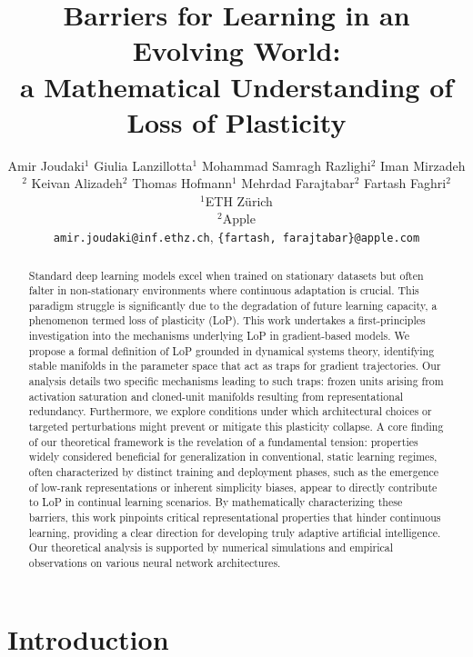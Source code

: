 \documentclass{article}
\title{Barriers for Learning in an Evolving World: \\a Mathematical Understanding of Loss of Plasticity}
\author{%
  Amir Joudaki$^{1}$ \And
  Giulia Lanzillotta$^{1}$ \And
  Mohammad Samragh Razlighi$^{2}$ \And
  Iman Mirzadeh$^{2}$ \And
  Keivan Alizadeh$^{2}$ \And
  Thomas Hofmann$^{1}$ \And
  Mehrdad Farajtabar$^{2}$ \And
  Fartash Faghri$^{2}$ \\
  $^{1}$ETH Zürich \\
  $^{2}$Apple \\
  \texttt{amir.joudaki@inf.ethz.ch},
  \texttt{\{fartash, farajtabar\}@apple.com}
}
\begin{document}
\maketitle

\begin{abstract}
    Standard deep learning models excel when trained on stationary datasets but often falter in non-stationary environments where continuous adaptation is crucial. This paradigm struggle is significantly due to the degradation of future learning capacity, a phenomenon termed loss of plasticity (LoP). This work undertakes a first-principles investigation into the mechanisms underlying LoP in gradient-based models. We propose a formal definition of LoP grounded in dynamical systems theory, identifying stable manifolds in the parameter space that act as traps for gradient trajectories. Our analysis details two specific mechanisms leading to such traps: frozen units arising from activation saturation and cloned-unit manifolds resulting from representational redundancy. Furthermore, we explore conditions under which architectural choices or targeted perturbations might prevent or mitigate this plasticity collapse.
    A core finding of our theoretical framework is the revelation of a fundamental tension: properties widely considered beneficial for generalization in conventional, static learning regimes, often characterized by distinct training and deployment phases, such as the emergence of low-rank representations or inherent simplicity biases, appear to directly contribute to LoP in continual learning scenarios.
    By mathematically characterizing these barriers, this work pinpoints critical representational properties that hinder continuous learning, providing a clear direction for developing truly adaptive artificial intelligence.
    Our theoretical analysis is supported by numerical simulations and empirical observations on various neural network architectures.
\end{abstract}

\section{Introduction}
\end{document}
